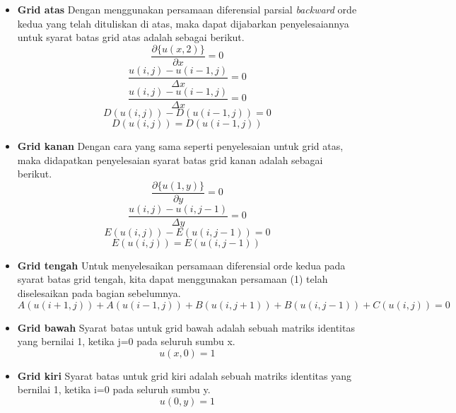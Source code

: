 \documentclass{article}
\begin{document}
\begin{itemize}
    \item \textbf{Grid atas}
        \subitem Dengan menggunakan persamaan diferensial parsial \textit{backward} orde kedua yang telah dituliskan di atas, maka dapat dijabarkan penyelesaiannya untuk syarat batas grid atas adalah sebagai berikut.
        \[\frac{\partial \{u(x,2)\}}{\partial x}=0\]
        \[\frac {u(i,j)-u(i-1,j)}{\Delta x}=0\]
        \[\frac {u(i,j)-u(i-1,j)}{\Delta x}=0\]
        \[D(u(i,j))-D(u(i-1,j))=0\]
        \begin{equation}
        D(u(i,j))=D(u(i-1,j)) 
        \end{equation}
    \item \textbf{Grid kanan}
        \subitem Dengan cara yang sama seperti penyelesaian untuk grid atas, maka didapatkan penyelesaian syarat batas grid kanan adalah sebagai berikut.
        \[\frac{\partial \{u(1,y)\}}{\partial y}=0\]
        \[\frac {u(i,j)-u(i,j-1)}{\Delta y}=0\]
        \[E(u(i,j))-E(u(i,j-1))=0\]
        \begin{equation}
        E(u(i,j))=E(u(i,j-1))\
        \end{equation}
    \item \textbf{Grid tengah}
        \subitem Untuk menyelesaikan persamaan diferensial orde kedua pada syarat batas grid tengah, kita dapat menggunakan persamaan (1) telah diselesaikan pada bagian sebelumnya.
        \begin{equation}
        A(u(i+1,j))+A (u(i-1,j))+ B(u(i,j+1))+B(u(i,j-1))+C(u(i,j))=0    \end{equation}
    \item \textbf{Grid bawah}
    \subitem Syarat batas untuk grid bawah adalah sebuah matriks identitas yang bernilai 1, ketika j=0 pada seluruh sumbu x.
    \begin{equation}
        u(x,0)=1
    \end{equation}
    \item \textbf{Grid kiri}
    \subitem Syarat batas untuk grid kiri adalah sebuah matriks identitas yang bernilai 1, ketika i=0 pada seluruh sumbu y.
    \begin{equation}
        u(0,y)=1
    \end{equation}
\end{itemize}
\end{document}
